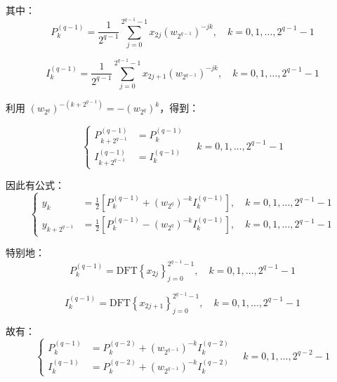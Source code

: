 \documentclass[12pt,a4paper]{article}
\numberwithin{subsection}{section}   %
\numberwithin{subsubsection}{subsection}
\theoremstyle{plain}
\theoremstyle{definition}
\theoremstyle{remark}
\theoremstyle{remark}
\begin{document}
其中：
\begin{equation}
	P_k^{(q-1)} = \frac{1}{2^{q-1}} \sum_{j=0}^{2^{q-1} -1} x_{2j} \left(w_{2^{q-1}}\right)^{-jk}, \quad k = 0, 1, \ldots, 2^{q-1} -1
\end{equation}

\begin{equation}
	I_k^{(q-1)} = \frac{1}{2^{q-1}} \sum_{j=0}^{2^{q-1} -1} x_{2j+1} \left(w_{2^{q-1}}\right)^{-jk}, \quad k = 0, 1, \ldots, 2^{q-1} -1
\end{equation}

利用 $\left(w_{2^q}\right)^{-(k + 2^{q-1})} = -\left(w_{2^q}\right)^k$，得到：

\begin{equation}
	\left\{
	\begin{aligned}
		P_{k + 2^{q-1}}^{(q-1)} &= P_k^{(q-1)} \\[8pt]
		I_{k + 2^{q-1}}^{(q-1)} &= I_k^{(q-1)}
	\end{aligned}
	\right.
	\quad k = 0, 1, \ldots, 2^{q-1} -1
\end{equation}

因此有公式：
\begin{equation}
	\left\{
	\begin{aligned}
		y_k &= \frac{1}{2} \left[ P_k^{(q-1)} + \left(w_{2^q}\right)^{-k} I_k^{(q-1)} \right], \quad k = 0, 1, \ldots, 2^{q-1} -1 \\[8pt]
		y_{k + 2^{q-1}} &= \frac{1}{2} \left[ P_k^{(q-1)} - \left(w_{2^q}\right)^{-k} I_k^{(q-1)} \right], \quad k = 0, 1, \ldots, 2^{q-1} -1
	\end{aligned}
	\right.
\end{equation}

特别地：
\begin{equation}
	P_k^{(q-1)} = \text{DFT} \left\{ x_{2j} \right\}_{j=0}^{2^{q-1} -1}, \quad k = 0, 1, \ldots, 2^{q-1} -1
\end{equation}

\begin{equation}
	I_k^{(q-1)} = \text{DFT} \left\{ x_{2j+1} \right\}_{j=0}^{2^{q-1} -1}, \quad k = 0, 1, \ldots, 2^{q-1} -1
\end{equation}

故有：
\begin{equation}
	\left\{
	\begin{aligned}
		P_k^{(q-1)} &= P_k^{(q-2)} + \left(w_{2^{q-1}}\right)^{-k} I_k^{(q-2)} \\[8pt]
		I_k^{(q-1)} &= P_k^{(q-2)} + \left(w_{2^{q-1}}\right)^{-k} I_k^{(q-2)}
	\end{aligned}
	\right.
	\quad k = 0, 1, \ldots, 2^{q-2} -1
\end{equation}
\end{document}
